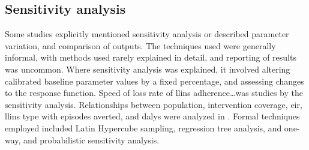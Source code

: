 \documentclass[a4paper, 12pt, twoside]{report}
\begin{document}
\subsection{Sensitivity analysis}%
\label{par:sensitivity_analysis}
Some studies\cite{Briet2013,Mohammed-Awel2019, White2018b} explicitly mentioned sensitivity analysis or described parameter variation, and comparison of outputs.
The techniques used were generally informal, with methods used rarely explained in detail, and reporting of results was uncommon.
Where sensitivity analysis was explained, it involved altering calibrated baseline parameter values by a fixed percentage, and assessing changes to the response function.
Speed of loss rate of \gls{llins} adherence\cite{White2018b}\ldots was studies by the sensitivity analysis.
Relationships between population, intervention coverage, \gls{eir}, \gls{llins} type with episodes averted, and \gls{dalys} were analyzed in \cite{Briet2013}.
Formal techniques employed included Latin Hypercube sampling, regression tree analysis, and one-way, and probabilistic sensitivity analysis.
\end{document}
